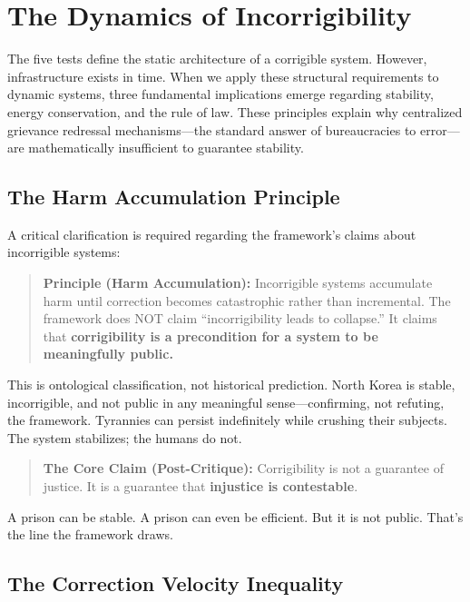 \section{The Dynamics of Incorrigibility}
\label{sec:dynamics}

The five tests define the static architecture of a corrigible system. However, infrastructure exists in time. When we apply these structural requirements to dynamic systems, three fundamental implications emerge regarding stability, energy conservation, and the rule of law. These principles explain why centralized grievance redressal mechanisms---the standard answer of bureaucracies to error---are mathematically insufficient to guarantee stability.

\subsection{The Harm Accumulation Principle}

A critical clarification is required regarding the framework's claims about incorrigible systems:

\begin{quote}
\textbf{Principle (Harm Accumulation):} Incorrigible systems accumulate harm until correction becomes catastrophic rather than incremental. The framework does NOT claim ``incorrigibility leads to collapse.'' It claims that \textbf{corrigibility is a precondition for a system to be meaningfully public.}
\end{quote}

This is ontological classification, not historical prediction. North Korea is stable, incorrigible, and not public in any meaningful sense---confirming, not refuting, the framework. Tyrannies can persist indefinitely while crushing their subjects. The system stabilizes; the humans do not.

\begin{quote}
\textbf{The Core Claim (Post-Critique):} Corrigibility is not a guarantee of justice. It is a guarantee that \textbf{injustice is contestable}.
\end{quote}

A prison can be stable. A prison can even be efficient. But it is not public. That's the line the framework draws.

\subsection{The Correction Velocity Inequality}
\label{subsec:velocity}

